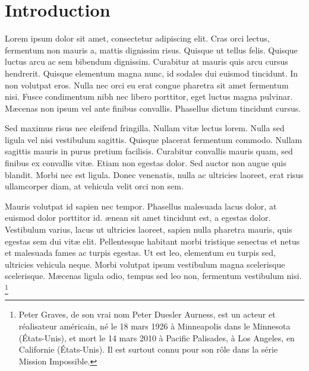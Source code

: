 \documentclass[11pt]{article} %
\begin{document}
%
%
\pagestyle{empty} 
%
%
\setlength{\baselineskip}{12.6pt} %
\setlength{\normalbaselineskip}{12.6pt} %

%
%

\section{Introduction\label{sec:intro}}

Lorem ipsum dolor sit amet, consectetur adipiscing elit. Cras orci lectus, fermentum non mauris a, mattis dignissim risus. Quisque ut tellus felis. Quisque luctus arcu ac sem bibendum dignissim. Curabitur at mauris quis arcu cursus hendrerit. Quisque elementum magna nunc, id sodales dui euismod tincidunt. In non volutpat eros. Nulla nec orci eu erat congue pharetra sit amet fermentum nisi. Fusce condimentum nibh nec libero porttitor, eget luctus magna pulvinar. M{\ae}cenas non ipsum vel ante finibus convallis. Phasellus dictum tincidunt cursus.

Sed maximus risus nec eleifend fringilla. Nullam vit{\ae} lectus lorem. Nulla sed ligula vel nisi vestibulum sagittis. Quisque placerat fermentum commodo. Nullam sagittis mauris in purus pretium facilisis. Curabitur convallis mauris quam, sed finibus ex convallis vit{\ae}. Etiam non egestas dolor. Sed auctor non augue quis blandit. Morbi nec est ligula. Donec venenatis, nulla ac ultricies laoreet, erat risus ullamcorper diam, at vehicula velit orci non sem. 

Mauris volutpat id sapien nec tempor. Phasellus malesuada lacus dolor, at euismod dolor porttitor id. {\ae}nean sit amet tincidunt est, a egestas dolor. Vestibulum varius, lacus ut ultricies laoreet, sapien nulla pharetra mauris, quis egestas sem dui vit{\ae} elit. Pellentesque habitant morbi tristique senectus et netus et malesuada fames ac turpis egestas. Ut est leo, elementum eu turpis sed, ultricies vehicula neque. Morbi volutpat ipsum vestibulum magna scelerisque scelerisque. M{\ae}cenas ligula odio, tempus sed leo non, fermentum vestibulum nisi.%
\footnote{Peter Graves, de son vrai nom Peter Duesler Aurness, est un acteur et
    r\'{e}alisateur am\'{e}ricain, n\'{e} le 18 mars 1926 \`{a} Minneapolis dans le Minnesota (\'{E}tats-Unis), et mort le 14 mars 2010 \`{a} Pacific Palisades, à Los Angeles, en Californie (\'{E}tats-Unis). Il est surtout connu pour son r\^{o}le dans la s\'{e}rie Mission Impossible. }
\end{document}
